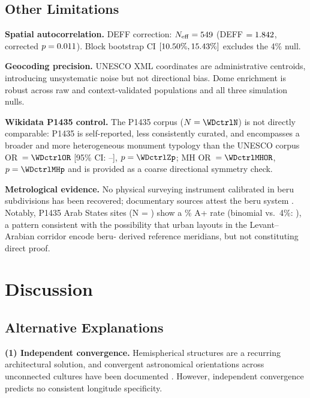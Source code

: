 \documentclass[HARVARD,twocolumn]{USG}
\begin{document}
\subsection{Other Limitations}

\textbf{Spatial autocorrelation.}
DEFF correction: $N_\mathrm{eff} = 549$ (DEFF $= 1.842$,
corrected $p = 0.011$). Block bootstrap CI
$[10.50\%, 15.43\%]$ excludes the 4\% null.

\textbf{Geocoding precision.}
UNESCO XML coordinates are administrative centroids, introducing
unsystematic noise but not directional bias. Dome enrichment is robust
across raw and context-validated populations and all three simulation nulls.

\textbf{Wikidata P1435 control.}
The P1435 corpus ($N = \WDctrlN$) is not directly comparable: 
P1435 is self-reported, less consistently curated, and encompasses 
a broader and more heterogeneous monument typology than the UNESCO corpus
OR~$= \WDctrlOR$ [95\% CI: \WDctrlORlo--\WDctrlORhi],
$p = \WDctrlZp$; MH OR~$= \WDctrlMHOR$, $p = \WDctrlMHp$ and is provided
as a coarse directional symmetry check.

\textbf{Metrological evidence.}
No physical surveying instrument calibrated in beru subdivisions has been 
recovered; documentary sources attest the beru 
system \citep{hunger2019mul,robson2008mathematics,powell1987metrological}. 
Notably, P1435 Arab States sites (N = \WDctrlArabN) show a \WDctrlArabRate\% 
A+ rate (binomial vs.\ 4\%: \WDctrlArabBinomP), a pattern consistent with the 
possibility that urban layouts in the Levant–Arabian corridor encode beru‑
derived reference meridians, but not constituting direct proof.


\section{Discussion}
\label{sec:discussion}

\subsection{Alternative Explanations}
\label{sec:alt_explanations}

\textbf{(1) Independent convergence.}
Hemispherical structures are a recurring architectural solution, and
convergent astronomical orientations across unconnected cultures have
been documented \citep{aveni2001skywatchers,aveni2003archaeoastronomy}. However,
independent convergence predicts no consistent longitude specificity.
\end{document}
